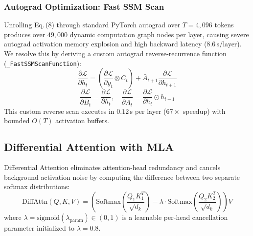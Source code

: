 \documentclass[10pt,twocolumn,letterpaper]{article}
\begin{document}
\subsubsection{Autograd Optimization: Fast SSM Scan}
Unrolling Eq.\,(8) through standard PyTorch autograd over $T = 4,096$ tokens produces over $49,000$ dynamic computation graph nodes per layer, causing severe autograd activation memory explosion and high backward latency (8.6\,s/layer). We resolve this by deriving a custom autograd reverse-recurrence function (\texttt{\_FastSSMScanFunction}):
\begin{equation}
    \frac{\partial \mathcal{L}}{\partial h_t} = \left( \frac{\partial \mathcal{L}}{\partial y_t} \otimes C_t \right) + \bar{A}_{t+1} \frac{\partial \mathcal{L}}{\partial h_{t+1}}
\end{equation}
\begin{equation}
    \frac{\partial \mathcal{L}}{\partial \bar{B}_t} = \frac{\partial \mathcal{L}}{\partial h_t}, \quad \frac{\partial \mathcal{L}}{\partial \bar{A}_t} = \frac{\partial \mathcal{L}}{\partial h_t} \odot h_{t-1}
\end{equation}
This custom reverse scan executes in $0.12$\,s per layer ($67\times$ speedup) with bounded $O(T)$ activation buffers.

\subsection{Differential Attention with MLA}
Differential Attention eliminates attention-head redundancy and cancels background activation noise by computing the difference between two separate softmax distributions:
\begin{equation}
    \text{DiffAttn}(Q, K, V) = \left( \text{Softmax}\left(\frac{Q_1 K_1^T}{\sqrt{d_k}}\right) - \lambda \cdot \text{Softmax}\left(\frac{Q_2 K_2^T}{\sqrt{d_k}}\right) \right) V
\end{equation}
where $\lambda = \text{sigmoid}(\lambda_{\text{param}}) \in (0, 1)$ is a learnable per-head cancellation parameter initialized to $\lambda = 0.8$.
\end{document}

